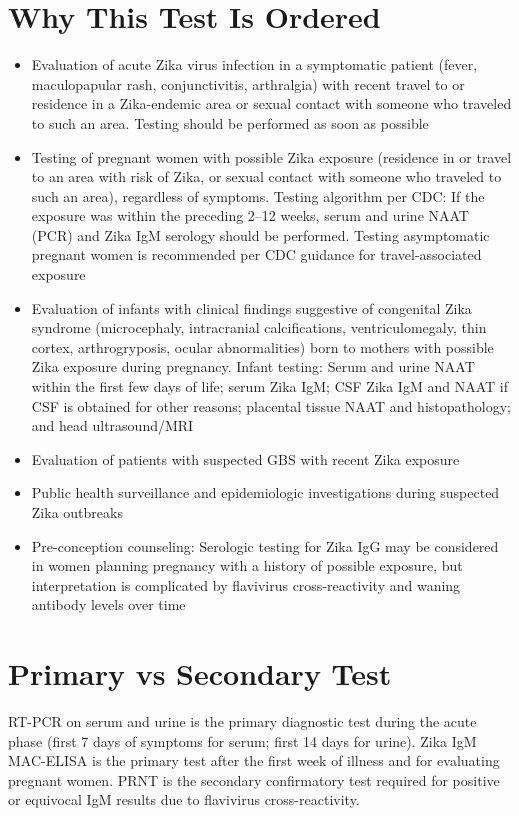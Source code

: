 \section*{Why This Test Is Ordered}
\begin{itemize}
  \item Evaluation of acute Zika virus infection in a symptomatic patient (fever, maculopapular rash, conjunctivitis, arthralgia) with recent travel to or residence in a Zika-endemic area or sexual contact with someone who traveled to such an area. Testing should be performed as soon as possible
  \item Testing of pregnant women with possible Zika exposure (residence in or travel to an area with risk of Zika, or sexual contact with someone who traveled to such an area), regardless of symptoms. Testing algorithm per CDC: If the exposure was within the preceding 2--12 weeks, serum and urine NAAT (PCR) and Zika IgM serology should be performed. Testing asymptomatic pregnant women is recommended per CDC guidance for travel-associated exposure
  \item Evaluation of infants with clinical findings suggestive of congenital Zika syndrome (microcephaly, intracranial calcifications, ventriculomegaly, thin cortex, arthrogryposis, ocular abnormalities) born to mothers with possible Zika exposure during pregnancy. Infant testing: Serum and urine NAAT within the first few days of life; serum Zika IgM; CSF Zika IgM and NAAT if CSF is obtained for other reasons; placental tissue NAAT and histopathology; and head ultrasound/MRI
  \item Evaluation of patients with suspected GBS with recent Zika exposure
  \item Public health surveillance and epidemiologic investigations during suspected Zika outbreaks
  \item Pre-conception counseling: Serologic testing for Zika IgG may be considered in women planning pregnancy with a history of possible exposure, but interpretation is complicated by flavivirus cross-reactivity and waning antibody levels over time
\end{itemize}

\section*{Primary vs Secondary Test}
RT-PCR on serum and urine is the primary diagnostic test during the acute phase (first 7 days of symptoms for serum; first 14 days for urine). Zika IgM MAC-ELISA is the primary test after the first week of illness and for evaluating pregnant women. PRNT is the secondary confirmatory test required for positive or equivocal IgM results due to flavivirus cross-reactivity.


